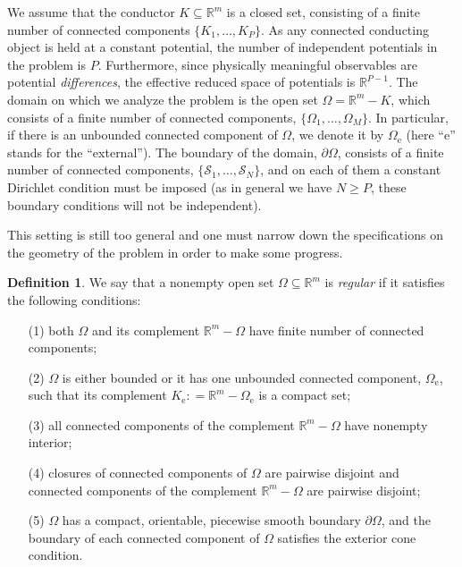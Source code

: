 \documentclass[12pt]{iopart}
\newcommand{\defeq}{\mathrel{\mathop:}=}
\newcommand{\dd}{\partial}
\newcommand{\0}{\vct{0}}
\newcommand{\rr}{\mathds{R}}
\theoremstyle{plain} \newtheorem{tm}{Theorem}[section]
\theoremstyle{plain} \newtheorem{lm}[tm]{Lemma}
\theoremstyle{definition} \newtheorem{defn}[tm]{Definition}
\newcommand{\bdefn}{\begin{defn}}
\newcommand{\edefn}{\end{defn}}
\begin{document}
We assume that the conductor $K \subseteq \rr^m$ is a closed set, consisting of a finite number of connected components $\{K_1,\dots,K_P\}$. As any connected conducting object is held at a constant potential, the number of independent potentials in the problem is $P$. Furthermore, since physically meaningful observables are potential \emph{differences}, the effective reduced space of potentials is $\rr^{P-1}$. The domain on which we analyze the problem is the open set $\Omega = \rr^m - K$, which consists of a finite number of connected components, $\{\Omega_1,\dots,\Omega_M\}$. In particular, if there is an unbounded connected component of $\Omega$, we denote it by $\Omega_{\mathrm{e}}$ (here ``e'' stands for the ``external''). The boundary of the domain, $\dd\Omega$, consists of a finite number of connected components, $\{\mathcal{S}_1,\dots,\mathcal{S}_N\}$, and on each of them a constant Dirichlet condition must be imposed (as in general we have $N \ge P$, these boundary conditions will not be independent).

\medskip

This setting is still too general and one must narrow down the specifications on the geometry of the problem in order to make some progress.

\medskip



\bdefn
We say that a nonempty open set $\Omega \subseteq \rr^m$ is \emph{regular} if it satisfies the following conditions:

\begin{itemize}
\item[(1)] both $\Omega$ and its complement $\rr^m - \Omega$ have finite number of connected components;

\item[(2)] $\Omega$ is either bounded or it has one unbounded connected component, $\Omega_{\mathrm{e}}$, such that its complement $K_{\mathrm{e}} \defeq \rr^m - \Omega_{\mathrm{e}}$ is a compact set; 

\item[(3)] all connected components of the complement $\rr^m - \Omega$ have nonempty interior;

\item[(4)] closures of connected components of $\Omega$ are pairwise disjoint and connected components of the complement $\rr^m - \Omega$ are pairwise disjoint;

\item[(5)] $\Omega$ has a compact, orientable, piecewise smooth boundary $\dd\Omega$, and the boundary of each connected component of $\Omega$ satisfies the exterior cone condition.
\end{itemize}
\edefn
\end{document}
